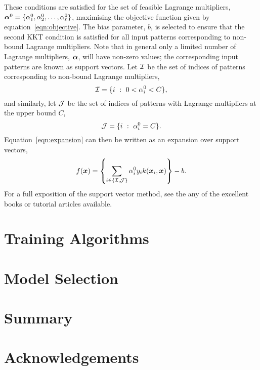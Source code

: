 \documentclass[twoside]{article}
\renewcommand{\vec}[1]{\mbox{\boldmath ${#1}$}}
\begin{document}
%
These conditions are satisfied for the set of feasible Lagrange multipliers,
$\vec{\alpha}^0 = \{\alpha_1^0, \alpha_2^0, \ldots, \alpha_\ell^0\}$,
maximising the objective function given by equation~\ref{eqn:objective}.  The
bias parameter, $b$, is selected to ensure that the second KKT condition is
satisfied for all input patterns corresponding to non-bound Lagrange
multipliers.  Note that in general only a limited number of Lagrange
multipliers, $\vec{\alpha}$, will have non-zero values; the corresponding
input patterns are known as support vectors.  Let ${\cal I}$ be the set
of indices of patterns corresponding to non-bound Lagrange multipliers,
%
\begin{displaymath}
   {\cal I} = \{i~:~0 < \alpha_i^0 < C \}, 
\end{displaymath} 
%
and similarly, let ${\cal J}$ be the set of indices of patterns with Lagrange
multipliers at the upper bound $C$,  
%
\begin{displaymath}
   {\cal J} = \{i~:~\alpha_i^0 = C \}.
\end{displaymath} 
%
Equation~\ref{eqn:expansion} can then be written as an expansion over support
vectors,
%
\begin{equation}
   f(\vec{x}) = \left\{ \sum_{i \in \{{\cal I, J}\}}\alpha_i^0y_ik(\vec{x}_i,\vec{x}) \right\} - b.
   \label{eqn:sv_expansion}
\end{equation}
%
For a full exposition of the support vector method, see the any of the
excellent books \cite{Vapnik1995,Vapnik1998,Cristianini2000} or tutorial
articles \cite{} available. 

\section{Training Algorithms}
\label{sec:training_algorithms}

\section{Model Selection}
\label{sec:model_selection}

\section{Summary}
\label{sec:summary}

\section{Acknowledgements}



\end{document}
